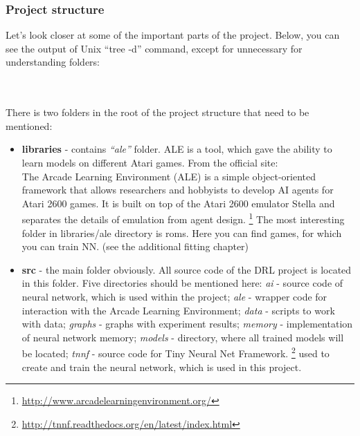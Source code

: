 \documentclass[a4paper,oneside,dvipsnames]{article}
\begin{document}
\subsubsection{Project structure}
Let's look closer at some of the important parts of the project. Below, you can see the output of Unix ``tree -d'' command, except for unnecessary for understanding folders:
\mbox{}\\
\mbox{}\\
\mbox{}\\

There is two folders in the root of the project structure that need to be mentioned:
\begin{itemize}
\item \textbf{libraries} - contains \textit{``ale''} folder. ALE is a tool, which gave the ability to learn models on different Atari games. From the official site: \\
  The Arcade Learning Environment (ALE) is a simple object-oriented framework that allows researchers and hobbyists to develop AI agents for Atari 2600 games. It is built on top of the Atari 2600 emulator Stella and separates the details of emulation from agent design. 
  \footnote{\url{http://www.arcadelearningenvironment.org/}}
The most interesting folder in libraries/ale directory is roms. Here you can find games, for which you can train NN. (see the additional fitting chapter)
\item \textbf{src} - the main folder obviously. All source code of the DRL project is located in this folder.
Five directories should be mentioned here:
\subitem \textit{ai} - source code of neural network, which is used within the project;
\subitem \textit{ale} - wrapper code for interaction with the Arcade Learning Environment;
\subitem \textit{data} - scripts to work with data;
\subitem \textit{graphs} - graphs with experiment results;
\subitem \textit{memory} - implementation of neural network memory;
\subitem \textit{models} - directory, where all trained models will be located;
\subitem \textit{tnnf} - source code for Tiny Neural Net Framework.
  \footnote{\url{http://tnnf.readthedocs.org/en/latest/index.html}}
  used to create and train the neural network, which is used in this project.
\end{itemize}
\end{document}
